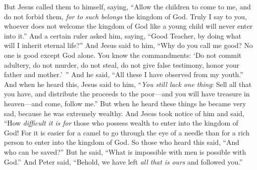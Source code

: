 \begin{biblechapter}
\verse But Jesus called them to himself, saying, “Allow the children to come to me, and do not forbid them, \textit{for to such belongs} the kingdom of God.
\verse Truly I say to you, whoever does not welcome the kingdom of God like a young child will never enter into it.”
 And a certain ruler asked him, saying, “Good Teacher, by doing what will I inherit eternal life?”
\verse And Jesus said to him, “Why do you call me good? No one is good except God alone.
\verse You know the commandments: ‘Do not commit adultery, do not murder, do not steal, do not give false testimony, honor your father and mother.’ ”
\verse And he said, “All these I have observed from my youth.”
\verse And when he heard this, Jesus said to him, “\textit{You still lack one thing}: Sell all that you have, and distribute the proceeds to the poor—and you will have treasure in heaven—and come, follow me.”
\verse But when he heard these things he became very sad, because he was extremely wealthy.
\verse And Jesus took notice of him and said, “How \textit{difficult it is for} those who possess wealth to enter into the kingdom of God!
\verse For it is easier for a camel to go through the eye of a needle than for a rich person to enter into the kingdom of God.
\verse So those who heard this said, “And who can be saved?”
\verse But he said, “What is impossible with men is possible with God.”
\verse And Peter said, “Behold, we have left \textit{all that is ours} and followed you.”

\end{biblechapter}
